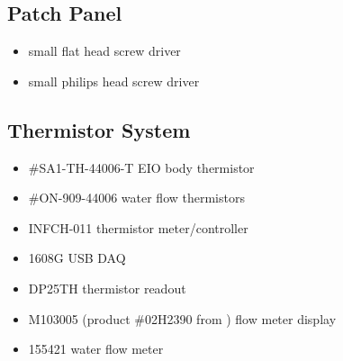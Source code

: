   \subsection{Patch Panel}
\begin{itemize}
 \item small flat head screw driver
 \item small philips head screw driver
\end{itemize}
\subsection{Thermistor System}
\begin{itemize}
 \item {} \#SA1-TH-44006-T EIO body thermistor
 \item {} \#ON-909-44006 water flow thermistors
 \item {} INFCH-011 thermistor meter/controller
 \item {} 1608G USB DAQ
 \item {} DP25TH thermistor readout
 \item {} M103005 (product \#02H2390 from ) flow meter display
 \item {} 155421 water flow meter
\end{itemize}


